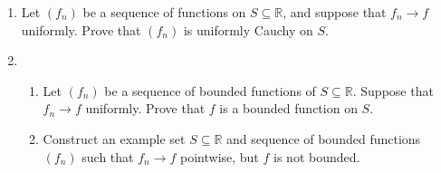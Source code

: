\documentclass[12pt]{article}
\newcommand{\R}{\mathbb{R}}
\begin{document}
\begin{enumerate}
  \item Let $(f_n)$ be a sequence of functions on $S\subseteq \R$, and suppose
    that $f_n \to f$ uniformly. Prove that $(f_n)$ is uniformly Cauchy on $S$.
  \item
    \begin{enumerate}
      \item Let $(f_n)$ be a sequence of bounded functions of $S\subseteq \R$.
        Suppose that $f_n \to f$ uniformly. Prove that $f$ is a bounded
        function on $S$.
      \item Construct an example set $S \subseteq \R$ and sequence of bounded
        functions $(f_n)$ such that $f_n \to f$ pointwise, but $f$ is not
        bounded.
    \end{enumerate}
\end{enumerate}
\end{document}
